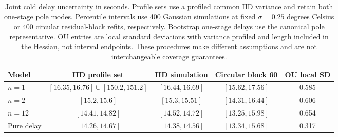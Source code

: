 \begin{table}[tbp]
\centering
\small
\begin{tabular}{lcccc}
\toprule
Model & IID profile set & IID simulation & Circular block 60 & OU local SD \\
\midrule
$n=1$ & $[16.35,16.76]\cup[150.2,151.2]$ & $[16.44,16.69]$ & $[15.62,17.56]$ & 0.585 \\
$n=2$ & $[15.2,15.6]$ & $[15.3,15.51]$ & $[14.31,16.44]$ & 0.606 \\
$n=12$ & $[14.41,14.82]$ & $[14.52,14.72]$ & $[13.25,15.98]$ & 0.654 \\
Pure delay & $[14.26,14.67]$ & $[14.38,14.56]$ & $[13.34,15.68]$ & 0.317 \\
\bottomrule
\end{tabular}
\caption{Joint cold delay uncertainty in seconds. Profile sets use a profiled common IID variance and retain both one-stage pole modes. Percentile intervals use 400 Gaussian simulations at fixed $\sigma=0.25$ degrees Celsius or 400 circular residual-block refits, respectively. Bootstrap one-stage delays use the canonical pole representative. OU entries are local standard deviations with variance profiled and length included in the Hessian, not interval endpoints. These procedures make different assumptions and are not interchangeable coverage guarantees.}
\label{tab:delay-uncertainty}
\end{table}
